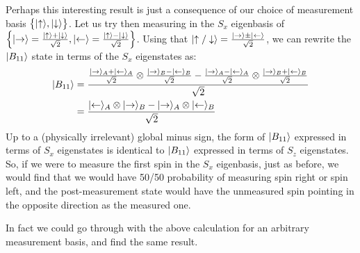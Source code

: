 Perhaps this interesting result is just a consequence of our choice of measurement basis $\set{\lvert \uparrow \rangle, \lvert \downarrow \rangle}$. Let us try then measuring in the $S_x$ eigenbasis of $\set{\lvert \rightarrow \rangle = \frac{\lvert \uparrow \rangle + \lvert \downarrow \rangle}{\sqrt{2}}, \lvert \leftarrow \rangle = \frac{\lvert \uparrow \rangle - \lvert \downarrow \rangle}{\sqrt{2}}}$. Using that $\lvert \uparrow/\downarrow \rangle = \frac{\lvert \rightarrow \rangle \pm \lvert \leftarrow \rangle}{\sqrt{2}}$, we can rewrite the $\lvert B_{11} \rangle$ state in terms of the $S_x$ eigenstates as:
\begin{equation}
    \begin{split}
        \lvert B_{11} \rangle &= \frac{\frac{\lvert \rightarrow \rangle_A + \lvert \leftarrow \rangle_A}{\sqrt{2}} \otimes \frac{\lvert \rightarrow \rangle_B - \lvert \leftarrow \rangle_B}{\sqrt{2}} - \frac{\lvert \rightarrow \rangle_A - \lvert \leftarrow \rangle_A}{\sqrt{2}} \otimes \frac{\lvert \rightarrow \rangle_B + \lvert \leftarrow \rangle_B}{\sqrt{2}}}{\sqrt{2}}
        \\ &= \frac{\lvert \leftarrow \rangle_A \otimes \lvert \rightarrow \rangle_B - \lvert \rightarrow \rangle_A \otimes \lvert \leftarrow \rangle_B}{\sqrt{2}}
    \end{split}
\end{equation}
Up to a (physically irrelevant) global minus sign, the form of $\lvert B_{11} \rangle$ expressed in terms of $S_x$ eigenstates is identical to $\lvert B_{11} \rangle$ expressed in terms of $S_z$ eigenstates. So, if we were to measure the first spin in the $S_x$ eigenbasis, just as before, we would find that we would have 50/50 probability of measuring spin right or spin left, and the post-measurement state would have the unmeasured spin pointing in the opposite direction as the measured one.

In fact we could go through with the above calculation for an arbitrary measurement basis, and find the same result.

